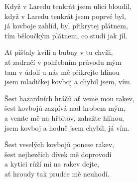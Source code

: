 
\ve{}
Když v Laredu tenkrát jsem ulicí bloudil,\\
když v Laredu tenkrát jsem poprvé byl,\\
já kovboje zahlíd, byl přikrytej plátnem,\\
tím běloučkým plátnem, co studí jak jíl.

\ve{}
Ať píšťaly kvílí a bubny v tu chvíli,\\
ať zadrnčí v pohřebním průvodu mým\\
tam v údolí u nás mě přikrejte hlínou\\
jsem mladičkej kovboj a chybil jsem, vím.

\ve{}
Šest hazardních hráčů ať veme mou rakev,\\
šest kovbojů zazpívá nad hrobem mým,\\
a vemte mě na hřbitov, zahažte hlínou,\\
jsem kovboj a hodně jsem chybil, já vím.

\ve{}
Šest veselých kovbojů ponese rakev,\\
šest nejhezčích dívek mě doprovodí\\
a kytici růží mi na rakev dejte,\\
ať hroudy tak prudce mě neuhodí. 

\esong
